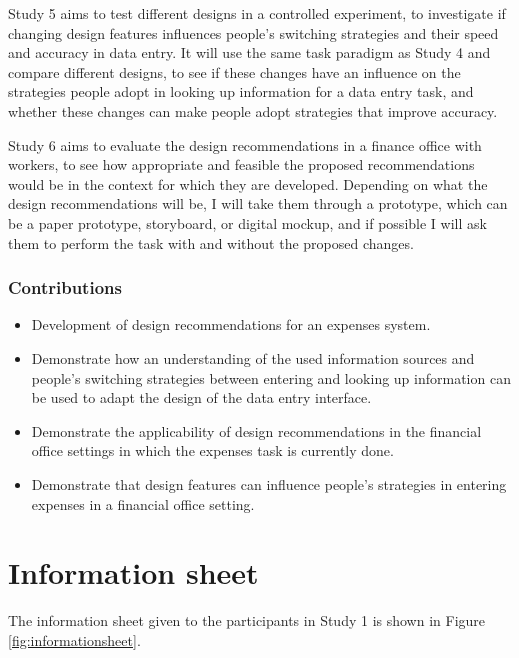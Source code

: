 \documentclass[11pt,oneside]{report}
\begin{document}
\begin{table}
Study 5 aims to test different designs in a controlled experiment, to investigate if changing design features influences people's switching strategies and their speed and accuracy in data entry. It will use the same task paradigm as Study 4 and compare different designs, to see if these changes have an influence on the strategies people adopt in looking up information for a data entry task, and whether these changes can make people adopt strategies that improve accuracy. 

Study 6 aims to evaluate the design recommendations in a finance office with workers, to see how appropriate and feasible the proposed recommendations would be in the context for which they are developed. Depending on what the design recommendations will be, I will take them through a prototype, which can be a paper prototype, storyboard, or digital mockup, and if possible I will ask them to perform the task with and without the proposed changes. 

\subsection{Contributions}
\begin{itemize}
\item
Development of design recommendations for an expenses system.
\item
Demonstrate how an understanding of the used information sources and people's switching strategies between entering and looking up information can be used to adapt the design of the data entry interface. 
\item
Demonstrate the applicability of design recommendations in the financial office settings in which the expenses task is currently done. 
\item
Demonstrate that design features can influence people's strategies in entering expenses in a financial office setting.
\end{itemize}




\appendix\label{ch:appendix}
\chapter{Information sheet}\label{ch:information_sheet}
The information sheet given to the participants in Study 1 is shown in Figure \ref{fig:informationsheet}. 


\end{table}
\end{document}
